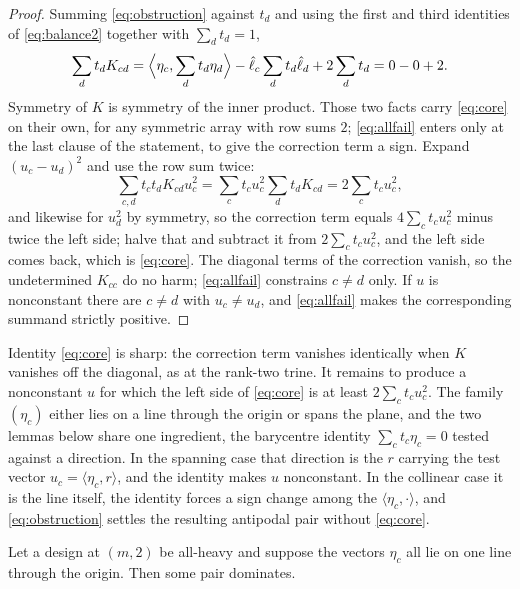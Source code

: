 \begin{proof}
Summing \eqref{eq:obstruction} against $t_d$ and using the first and
third identities of \eqref{eq:balance2} together with $\sum_dt_d=1$,
\[
  \sum_d t_dK_{cd}
  =\Bigl\langle \eta_c,\sum_d t_d\eta_d\Bigr\rangle
   -\hat\ell_c\sum_d t_d\hat\ell_d+2\sum_d t_d
  =0-0+2 .
\]
Symmetry of $K$ is symmetry of the inner product.  Those two facts carry
\eqref{eq:core} on their own, for any symmetric array with row sums $2$;
\eqref{eq:allfail} enters only at the last clause of the statement, to
give the correction term a sign.  Expand $(u_c-u_d)^2$ and use the row sum
twice:
\[
  \sum_{c,d}t_ct_dK_{cd}u_c^2
  =\sum_c t_cu_c^2\sum_d t_dK_{cd}
  =2\sum_c t_cu_c^2 ,
\]
and likewise for $u_d^2$ by symmetry, so the correction term equals
$4\sum_ct_cu_c^2$ minus twice the left side; halve that and subtract it
from $2\sum_ct_cu_c^2$, and the left side comes back, which is
\eqref{eq:core}.  The diagonal terms of the correction vanish, so the
undetermined $K_{cc}$ do no harm; \eqref{eq:allfail} constrains $c\ne d$
only.  If $u$ is nonconstant there are $c\ne d$ with $u_c\ne u_d$, and
\eqref{eq:allfail} makes the corresponding summand strictly positive.
\end{proof}

Identity \eqref{eq:core} is sharp: the correction term vanishes
identically when $K$ vanishes off the diagonal, as at the rank-two trine.
It remains to produce a nonconstant $u$ for which the left side of
\eqref{eq:core} is at least $2\sum_ct_cu_c^2$.  The family $(\eta_c)$
either lies on a line through the origin or spans the plane, and the two
lemmas below share one ingredient, the barycentre identity
$\sum_ct_c\eta_c=0$ tested against a direction.  In the spanning case that
direction is the $r$ carrying the test vector $u_c=\langle
\eta_c,r\rangle$, and the identity makes $u$ nonconstant.  In the
collinear case it is the line itself, the identity forces a sign change
among the $\langle \eta_c,\cdot\rangle$, and \eqref{eq:obstruction}
settles the resulting antipodal pair without \eqref{eq:core}.

\begin{lemma}\label{lem:collinear}
Let a design at $(m,2)$ be all-heavy and suppose the vectors $\eta_c$ all lie
on one line through the origin.  Then some pair dominates.
\end{lemma}

